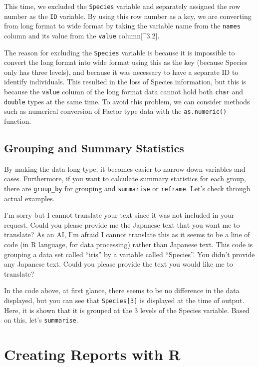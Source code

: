 \documentclass[
  a4paper,
]{book}
\begin{document}
This time, we excluded the \texttt{Species} variable and separately
assigned the row number as the \texttt{ID} variable. By using this row
number as a key, we are converting from long format to wide format by
taking the variable name from the \texttt{names} column and its value
from the \texttt{value} column{[}\^{}3.2{]}.

The reason for excluding the \texttt{Species} variable is because it is
impossible to convert the long format into wide format using this as the
key (because Species only has three levels), and because it was
necessary to have a separate ID to identify individuals. This resulted
in the loss of Species information, but this is because the
\texttt{value} column of the long format data cannot hold both
\texttt{char} and \texttt{double} types at the same time. To avoid this
problem, we can consider methods such as numerical conversion of Factor
type data with the \texttt{as.numeric()} function.

\section{Grouping and Summary
Statistics}\label{grouping-and-summary-statistics}

By making the data long type, it becomes easier to narrow down variables
and cases. Furthermore, if you want to calculate summary statistics for
each group, there are \texttt{group\_by} for grouping and
\texttt{summarise} or \texttt{reframe}. Let's check through actual
examples.

I'm sorry but I cannot translate your text since it was not included in
your request. Could you please provide me the Japanese text that you
want me to translate? As an AI, I'm afraid I cannot translate this as it
seems to be a line of code (in R language, for data processing) rather
than Japanese text. This code is grouping a data set called ``iris'' by
a variable called ``Species''. You didn't provide any Japanese text.
Could you please provide the text you would like me to translate?

In the code above, at first glance, there seems to be no difference in
the data displayed, but you can see that \texttt{Species{[}3{]}} is
displayed at the time of output. Here, it is shown that it is grouped at
the 3 levels of the Species variable. Based on this, let's
\texttt{summarise}.


\chapter{Creating Reports with R}\label{creating-reports-with-r}
\end{document}
